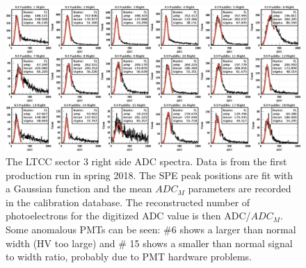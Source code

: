 \begin{figure}
	\centering
	\includegraphics[width=2.1\columnwidth,keepaspectratio]{img/spe.png}
	\caption{The LTCC sector 3 right side ADC spectra. Data is from the first production run in spring 2018.
          The SPE peak positions are fit with a Gaussian function and the mean $ADC_M$ parameters are recorded
          in the calibration database. The reconstructed number of photoelectrons for the digitized ADC value is
          then ADC/$ADC_M$. Some anomalous PMTs can be seen: \#6 shows a larger than normal width (HV too large)
          and \# 15 shows a smaller than normal signal to width ratio, probably due to PMT hardware problems.}
	\label{fig:speCalibration}
\end{figure}
